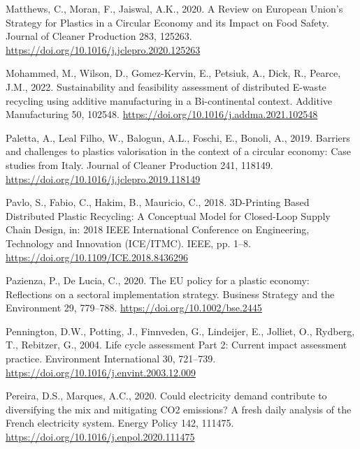 \documentclass[12pt]{elsarticle} %
\newlength{\cslhangindent}
\newlength{\cslentryspacingunit} %
\newenvironment{CSLReferences}[2] %
 {%
  \setlength{\parindent}{0pt}
  \ifodd #1
  \let\oldpar\par
  \def\par{\hangindent=\cslhangindent\oldpar}
  \fi
  \setlength{\parskip}{#2\cslentryspacingunit}
 }%
 {}
\begin{document}
\begin{CSLReferences}{1}{0}
\leavevmode{}%
Matthews, C., Moran, F., Jaiswal, A.K., 2020. A {Review} on {European Union}'s {Strategy} for {Plastics} in a {Circular Economy} and its {Impact} on {Food Safety}. Journal of Cleaner Production 283, 125263. \url{https://doi.org/10.1016/j.jclepro.2020.125263}

\leavevmode{}%
Mohammed, M., Wilson, D., Gomez-Kervin, E., Petsiuk, A., Dick, R., Pearce, J.M., 2022. Sustainability and feasibility assessment of distributed {E-waste} recycling using additive manufacturing in a {Bi-continental} context. Additive Manufacturing 50, 102548. \url{https://doi.org/10.1016/j.addma.2021.102548}

\leavevmode{}%
Paletta, A., Leal Filho, W., Balogun, A.L., Foschi, E., Bonoli, A., 2019. Barriers and challenges to plastics valorisation in the context of a circular economy: {Case} studies from {Italy}. Journal of Cleaner Production 241, 118149. \url{https://doi.org/10.1016/j.jclepro.2019.118149}

\leavevmode{}%
Pavlo, S., Fabio, C., Hakim, B., Mauricio, C., 2018. {3D-Printing Based Distributed Plastic Recycling}: {A Conceptual Model} for {Closed-Loop Supply Chain Design}, in: 2018 {IEEE International Conference} on {Engineering}, {Technology} and {Innovation} ({ICE}/{ITMC}). {IEEE}, pp. 1--8. \url{https://doi.org/10.1109/ICE.2018.8436296}

\leavevmode{}%
Pazienza, P., De Lucia, C., 2020. The {EU} policy for a plastic economy: {Reflections} on a sectoral implementation strategy. Business Strategy and the Environment 29, 779--788. \url{https://doi.org/10.1002/bse.2445}

\leavevmode{}%
Pennington, D.W., Potting, J., Finnveden, G., Lindeijer, E., Jolliet, O., Rydberg, T., Rebitzer, G., 2004. Life cycle assessment {Part} 2: {Current} impact assessment practice. Environment International 30, 721--739. \url{https://doi.org/10.1016/j.envint.2003.12.009}

\leavevmode{}%
Pereira, D.S., Marques, A.C., 2020. Could electricity demand contribute to diversifying the mix and mitigating {CO2} emissions? {A} fresh daily analysis of the {French} electricity system. Energy Policy 142, 111475. \url{https://doi.org/10.1016/j.enpol.2020.111475}


\end{CSLReferences}
\end{document}
